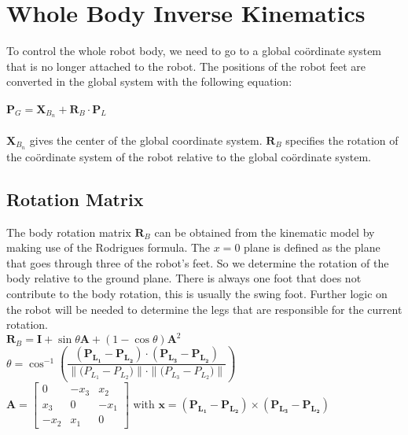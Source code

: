 \documentclass[a4paper,10pt]{article}
\begin{document}
\newpage
\section{Whole Body Inverse Kinematics}
To control the whole robot body, we need to go to a global co\"{o}rdinate system that is no longer attached to the robot. The positions of the robot feet are converted in the global system with the following equation:
\\\\
$
\mathbf{P}_{G} = \mathbf{X}_{B_{n}}+\mathbf{R}_{B}\cdot\mathbf{P}_{L}
$
\\\\
$\mathbf{X}_{B_{n}}$ gives the center of the global coordinate system. $\mathbf{R}_{B}$ specifies the rotation of the co\"{o}rdinate system of the robot relative to the global co\"{o}rdinate system.
\subsection{Rotation Matrix}
The body rotation matrix $\mathbf{R}_{B}$ can be obtained from the kinematic model by making use of the Rodrigues formula. The $x=0$ plane is defined as the plane that goes through three of the robot's feet. So we determine the rotation of the body relative to the ground plane. There is always one foot that does not contribute to the body rotation, this is usually the swing foot. Further logic on the robot will be needed to determine the legs that are responsible for the current rotation.
\vspace{5mm}
\\
$
\mathbf{R}_{B}=\mathbf{I}+\sin{\theta}\mathbf{A}+(1-\cos{\theta})\mathbf{A}^2
$
\vspace{5mm}
\\
$
\theta = \cos^{-1}{\left(\dfrac{(\mathbf{P_{L_1}} - \mathbf{P_{L_2}})\cdot(\mathbf{P_{L_3}}-\mathbf{P_{L_2}})}{\|\mathbf(P_{L_1}-P_{L_2})\|\cdot\|\mathbf(P_{L_3}-P_{L_2})\|}\right)}
$
\vspace{5mm}
\\
$
\mathbf{A} =  \begin{bmatrix}
              0 & -x_3 & x_2 \\ 
              x_3 & 0 & -x_1 \\ 
              -x_2 & x_1 & 0  
              \end{bmatrix}
$
 with 
$
\mathbf{x} = (\mathbf{P_{L_1}} - \mathbf{P_{L_2}})\times(\mathbf{P_{L_3}}-\mathbf{P_{L_2}})
$
\end{document}
